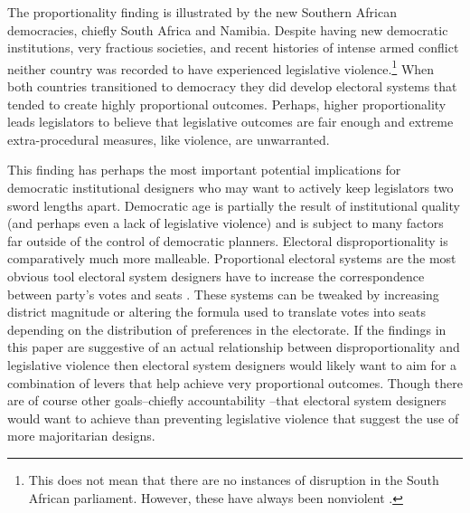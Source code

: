 \documentclass[a4paper]{article}\usepackage{graphicx, color}
\begin{document}
The proportionality finding is illustrated by the new Southern African democracies, chiefly South Africa and Namibia. Despite having new democratic institutions, very fractious societies, and recent histories of intense armed conflict neither country was recorded to have experienced legislative violence.\footnote{This does not mean that there are no instances of disruption in the South African parliament. However, these have always been nonviolent \cite{Johnson2013}.} When both countries transitioned to democracy they did develop electoral systems that tended to create highly proportional outcomes. Perhaps, higher proportionality leads legislators to believe that legislative outcomes are fair enough and extreme extra-procedural measures, like violence, are unwarranted.    

This finding has perhaps the most important potential implications for democratic institutional designers who may want to actively keep legislators two sword lengths apart. Democratic age is partially the result of institutional quality (and perhaps even a lack of legislative violence) and is subject to many factors far outside of the control of democratic planners. Electoral disproportionality is comparatively much more malleable. Proportional electoral systems are the most obvious tool electoral system designers have to increase the correspondence between party's votes and seats \citep{Carey2011}. These systems can be tweaked by increasing district magnitude or altering the formula used to translate votes into seats depending on the distribution of preferences in the electorate. If the findings in this paper are suggestive of an actual relationship between disproportionality and legislative violence then electoral system designers would likely want to aim for a combination of levers that help achieve very proportional outcomes. Though there are of course other goals--chiefly accountability \citep{Lijphart1984, Powell2000}--that electoral system designers would want to achieve than preventing legislative violence that suggest the use of more majoritarian designs. 
\end{document}
